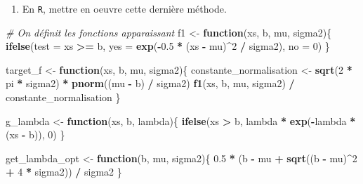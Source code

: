 \documentclass[]{article}
\newenvironment{Shaded}{\begin{snugshade}}{\end{snugshade}}
\newcommand{\CommentTok}[1]{\textcolor[rgb]{0.56,0.35,0.01}{\textit{#1}}}
\newcommand{\ControlFlowTok}[1]{\textcolor[rgb]{0.13,0.29,0.53}{\textbf{#1}}}
\newcommand{\DataTypeTok}[1]{\textcolor[rgb]{0.13,0.29,0.53}{#1}}
\newcommand{\DecValTok}[1]{\textcolor[rgb]{0.00,0.00,0.81}{#1}}
\newcommand{\FloatTok}[1]{\textcolor[rgb]{0.00,0.00,0.81}{#1}}
\newcommand{\KeywordTok}[1]{\textcolor[rgb]{0.13,0.29,0.53}{\textbf{#1}}}
\newcommand{\NormalTok}[1]{#1}
\newcommand{\OperatorTok}[1]{\textcolor[rgb]{0.81,0.36,0.00}{\textbf{#1}}}
\newcommand{\StringTok}[1]{\textcolor[rgb]{0.31,0.60,0.02}{#1}}
\providecommand{\tightlist}{%
  \setlength{\itemsep}{0pt}\setlength{\parskip}{0pt}}
\begin{document}
\begin{enumerate}
\def\labelenumi{\arabic{enumi}.}
\setcounter{enumi}{5}
\tightlist
\item
  En \texttt{R}, mettre en oeuvre cette dernière méthode.
\end{enumerate}

\begin{Shaded}
\begin{Highlighting}[]
\CommentTok{# On définit les fonctions apparaissant}
\NormalTok{f1 <-}\StringTok{ }\ControlFlowTok{function}\NormalTok{(xs, b, mu, sigma2)\{}
  \KeywordTok{ifelse}\NormalTok{(}\DataTypeTok{test =}\NormalTok{ xs }\OperatorTok{>=}\StringTok{ }\NormalTok{b,}
         \DataTypeTok{yes =} \KeywordTok{exp}\NormalTok{(}\OperatorTok{-}\FloatTok{0.5} \OperatorTok{*}\StringTok{ }\NormalTok{(xs }\OperatorTok{-}\StringTok{ }\NormalTok{mu)}\OperatorTok{^}\DecValTok{2} \OperatorTok{/}\StringTok{ }\NormalTok{sigma2),}
         \DataTypeTok{no =} \DecValTok{0}\NormalTok{)}
\NormalTok{\}}

\NormalTok{target_f <-}\StringTok{ }\ControlFlowTok{function}\NormalTok{(xs, b, mu, sigma2)\{}
\NormalTok{  constante_normalisation <-}\StringTok{ }\KeywordTok{sqrt}\NormalTok{(}\DecValTok{2} \OperatorTok{*}\StringTok{ }\NormalTok{pi }\OperatorTok{*}\StringTok{ }\NormalTok{sigma2) }\OperatorTok{*}\StringTok{ }\KeywordTok{pnorm}\NormalTok{((mu }\OperatorTok{-}\StringTok{ }\NormalTok{b) }\OperatorTok{/}\StringTok{ }\NormalTok{sigma2)}
  \KeywordTok{f1}\NormalTok{(xs, b, mu, sigma2) }\OperatorTok{/}\StringTok{ }\NormalTok{constante_normalisation}
\NormalTok{\}}

\NormalTok{g_lambda <-}\StringTok{ }\ControlFlowTok{function}\NormalTok{(xs, b, lambda)\{}
  \KeywordTok{ifelse}\NormalTok{(xs }\OperatorTok{>}\StringTok{ }\NormalTok{b, lambda }\OperatorTok{*}\StringTok{ }\KeywordTok{exp}\NormalTok{(}\OperatorTok{-}\NormalTok{lambda }\OperatorTok{*}\StringTok{ }\NormalTok{(xs }\OperatorTok{-}\StringTok{ }\NormalTok{b)), }\DecValTok{0}\NormalTok{)}
\NormalTok{\}}

\NormalTok{get_lambda_opt <-}\StringTok{ }\ControlFlowTok{function}\NormalTok{(b, mu, sigma2)\{}
  \FloatTok{0.5} \OperatorTok{*}\StringTok{ }\NormalTok{(b }\OperatorTok{-}\StringTok{ }\NormalTok{mu }\OperatorTok{+}\StringTok{ }\KeywordTok{sqrt}\NormalTok{((b }\OperatorTok{-}\StringTok{ }\NormalTok{mu)}\OperatorTok{^}\DecValTok{2} \OperatorTok{+}\StringTok{ }\DecValTok{4} \OperatorTok{*}\StringTok{ }\NormalTok{sigma2)) }\OperatorTok{/}\StringTok{ }\NormalTok{sigma2}
\NormalTok{\}}


\end{Highlighting}
\end{Shaded}
\end{document}
